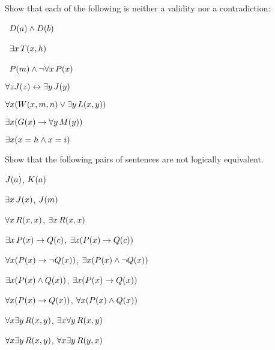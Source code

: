 \solutions
\problempart
\label{pr.Contingent}
Show that each of the following is neither a validity nor a contradiction:
\begin{compactlist}
\item \leftsolutions\ $\mathord{D}(a)  \wedge \mathord{D}(b)$
\item \leftsolutions\ $\exists x\, \mathord{T}(x,h)$
\item \leftsolutions\ $\mathord{P}(m)  \wedge \neg\forall x\, \mathord{P}(x)$
\item $\forall z \mathord{J}(z) \leftrightarrow \exists y\, \mathord{J}(y)$
\item $\forall x (\mathord{W}(x,m,n) \vee \exists y\,\mathord{L}(x,y))$
\item $\exists x (\mathord{G}(x) \rightarrow \forall y\, \mathord{M}(y))$
\item $\exists x (x = h \wedge x = i)$
\end{compactlist}

\solutions
\problempart
\label{pr.NotEquiv}
Show that the following pairs of sentences are not logically equivalent.
\begin{compactlist}
\item $\mathord{J}(a) $,  $\mathord{K}(a)$
\item $\exists x\, \mathord{J}(x)$,  $\mathord{J}(m)$
\item $\forall x\, \mathord{R}(x,x)$, $\exists x\, \mathord{R}(x,x)$
\item $\exists x\, \mathord{P}(x) \rightarrow \mathord{Q}(c)$, $\exists x (\mathord{P}(x) \rightarrow \mathord{Q}(c))$
\item $\forall x(\mathord{P}(x) \rightarrow \neg \mathord{Q}(x))$, $\exists x(\mathord{P}(x) \wedge \neg \mathord{Q}(x))$
\item $\exists x(\mathord{P}(x) \wedge \mathord{Q}(x))$, $\exists x(\mathord{P}(x) \rightarrow \mathord{Q}(x))$
\item $\forall x(\mathord{P}(x)\rightarrow \mathord{Q}(x))$, $\forall x(\mathord{P}(x) \wedge \mathord{Q}(x))$
\item $\forall x\exists y\, \mathord{R}(x,y)$, $\exists x\forall y\, \mathord{R}(x,y)$
\item $\forall x\exists y\, \mathord{R}(x,y)$, $\forall x\exists y\, \mathord{R}(y,x)$
\end{compactlist}



